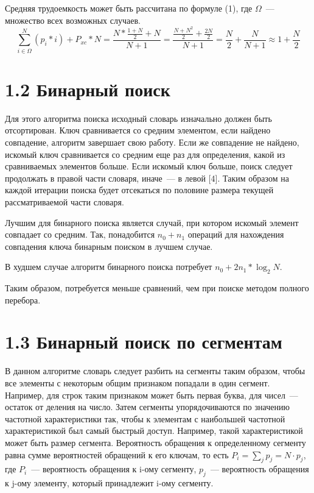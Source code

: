 \documentclass[12pt, a4paper]{report}
\begin{document}
	Средняя трудоемкость может быть рассчитана по формуле (1), где $\Omega$~--- множество всех возможных случаев.
	\begin{equation}
		\sum_{i\in\Omega}^{N} (p_i * i) + P_{xc} * N = \frac{N*\frac{1+N}{2}+N}{N+1} = \frac{\frac{N+N^2}{2}+\frac{2N}{2}}{N+1} = \frac{N}{2}+\frac{N}{N+1} \approx 1 + \frac{N}{2} 
	\end{equation}
	
	\section*{1.2 Бинарный поиск}
	
	Для этого алгоритма поиска исходный словарь изначально должен быть отсортирован. Ключ сравнивается со средним элементом, если найдено совпадение, алгоритм завершает свою работу. Если же совпадение не найдено, искомый ключ сравнивается со средним еще раз для определения, какой из сравниваемых элементов больше. Если искомый ключ больше, поиск следует продолжать в правой части словаря, иначе~--- в левой [4]. Таким образом на каждой итерации поиска будет отсекаться по половине размера текущей рассматриваемой части словаря.
	
	Лучшим для бинарного поиска является случай, при котором искомый элемент совпадает со средним. Так, понадобится $n_0 + n_1$ операций для нахождения совпадения ключа бинарным поиском в лучшем случае. 
	
	В худшем случае алгоритм бинарного поиска потребует $n_0 + 2n_1 * \log_2 N$.
	
	Таким образом, потребуется меньше сравнений, чем при поиске методом полного перебора.
	
	\section*{1.3 Бинарный поиск по сегментам}
	
	В данном алгоритме словарь следует разбить на сегменты таким образом, чтобы все элементы с некоторым общим признаком попадали в один сегмент. Например, для строк таким признаком может быть первая буква, для чисел~--- остаток от деления на число. Затем сегменты упорядочиваются по значению частотной характеристики так, чтобы к элементам с наибольшей частотной характеристикой был самый быстрый доступ. Например, такой характеристикой может быть размер сегмента. Вероятность обращения к определенному сегменту равна сумме вероятностей обращений к его ключам, то есть $P_i = \sum_{j} p_j = N · p_j$, где $P_i$~--- вероятность обращения к i-ому сегменту, $p_j$~--- вероятность обращения к j-ому элементу, который принадлежит i-ому сегменту.
	
\end{document}
